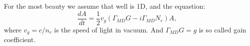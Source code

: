 For the most beauty we assume that well is 1D, and the equastion:
\begin{equation}
	\frac{d A}{d t} = \frac{1}{2} v_g (\Gamma_{MD}G - i \Gamma_{MD} N_r)A,
\end{equation}
where $v_g = c/n_r$ is the speed of light in vacuum. And $\Gamma_{MD}G = g$ is so called gain coefficient.